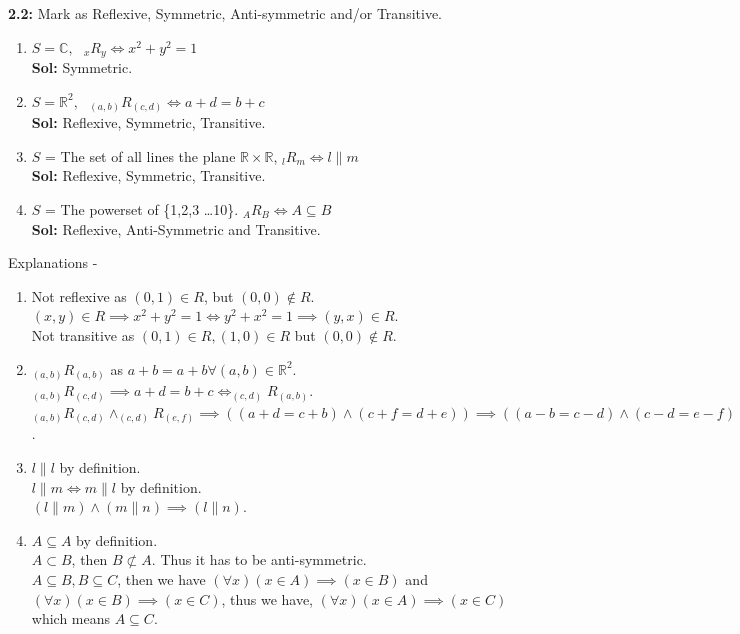 \documentclass[xcolor=svgnames]{beamer}
\begin{document}
\begin{frame}
\textbf{2.2:} Mark as Reflexive, Symmetric, Anti-symmetric and/or Transitive.
\begin{enumerate}
    \item $S = \mathbb{C},\text{ } _{x}R_{y} \iff x^2 + y^2 = 1$
    \\ \textbf{Sol:} Symmetric.
    \item $S = \mathbb{R}^2,\text{ } _{(a,b)}R_{(c,d)} \iff a + d = b + c$
    \\ \textbf{Sol:} Reflexive, Symmetric, Transitive.
    \item $S$ = The set of all lines the plane $\mathbb{R} \times \mathbb{R}$, $_{l}R_{m} \iff l \parallel m$ 
    \\ \textbf{Sol:} Reflexive, Symmetric, Transitive.
    \item $S$ = The powerset of \{1,2,3 \ldots 10\}. $_{A}R_{B} \iff A \subseteq B$ 
    \\ \textbf{Sol:} Reflexive, Anti-Symmetric and Transitive.
\end{enumerate}
\end{frame}

\begin{frame}
Explanations - 
\begin{enumerate}
    \item Not reflexive as $(0,1) \in {R}$, but $(0,0) \notin {R}$. 
    \\ $(x,y) \in R \implies x^2 + y^2 = 1 \iff y^2 + x^2 = 1 \implies (y,x) \in R$. 
    \\ Not transitive as $(0,1) \in R, (1,0) \in R$ but $(0,0) \notin R$.
    \item $_{(a,b)}R_{(a,b)}$ as $a + b = a + b \forall (a,b) \in \mathbb{R}^2$.
    \\ $_{(a,b)}R_{(c,d)} \implies a + d = b + c \iff _{(c,d)}R_{(a,b)}$.
    \\ $_{(a,b)}R_{(c,d)} \land _{(c,d)}R_{(e,f)} \implies ((a + d = c + b) \land (c + f = d + e)) \implies ((a - b = c - d) \land (c - d = e - f)) \implies (a + f = b + e) \implies _{(a,b)}R_{(e,f)}$.
    \item $l \parallel l$ by definition.
    \\ $l \parallel m \iff m \parallel l$ by definition.
    \\ $(l \parallel m) \land (m \parallel n) \implies (l \parallel n)$.
    \item $A \subseteq A$ by definition.
    \\ $A \subset B$, then $B \not\subset A$. Thus it has to be anti-symmetric.
    \\ $A \subseteq B, B \subseteq C$, then we have $(\forall x)(x \in A) \implies (x \in B)$ and $(\forall x)(x \in B) \implies (x \in C)$, thus we have, $(\forall x)(x \in A) \implies (x \in C)$ which means $A \subseteq C$.
\end{enumerate}
\end{frame}
\end{document}
